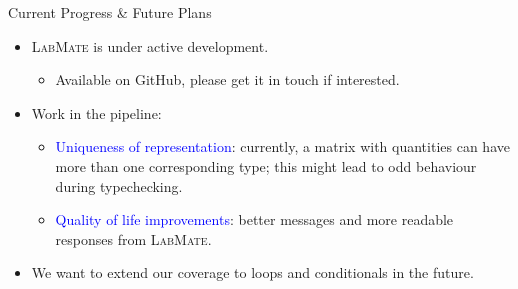 \documentclass[]{beamer}
\newcommand{\keyword}[1]{\textcolor{blue}{#1}}
\newcommand{\lm}{\textsc{LabMate}\xspace}
\begin{document}
\begin{frame}{Current Progress \& Future Plans}
  \begin{itemize}[<+->]
  \item \lm is under active development.
    \smallskip
    \begin{itemize}
    \item Available on GitHub, please get it in touch if interested.
    \end{itemize}
    \bigskip
  \item Work in the pipeline:
    \smallskip
    \begin{itemize}
    \item \keyword{Uniqueness of representation}: currently, a matrix with quantities can have more than one corresponding type; this might lead to odd behaviour during typechecking.
      \medskip
    \item \keyword{Quality of life improvements}: better messages and more readable responses from \lm.
      \medskip
      \end{itemize}
  \item We want to extend our coverage to loops and conditionals in the future.
  \end{itemize}
\end{frame}
\end{document}
